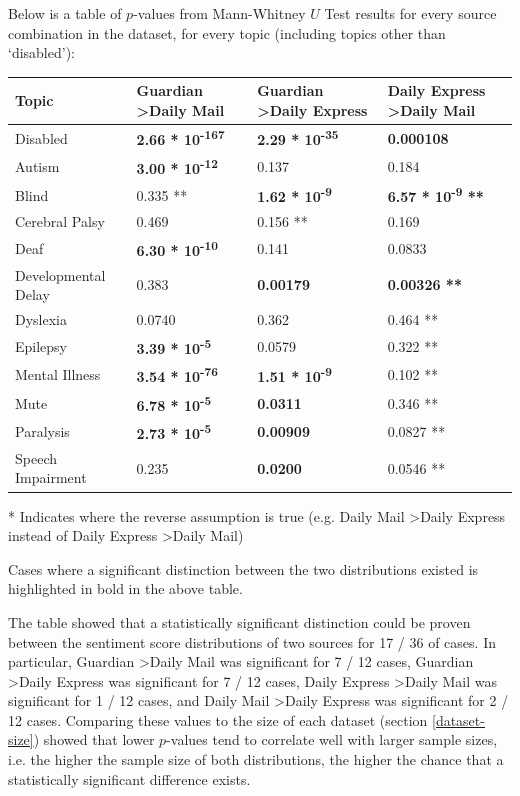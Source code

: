 \documentclass{report}
\begin{document}
Below is a table of $p$-values from Mann-Whitney $U$ Test results for every source combination in the dataset, for every topic (including topics other than `disabled'):

\noindent
\begin{tabu} to \textwidth { | X[c] | X[c] | X[c] | X[c] | }
	\hline
	Topic & Guardian \textgreater\space Daily Mail & Guardian \textgreater\space Daily Express & Daily Express \textgreater\space Daily Mail  \\
		\hline
	Disabled & \textbf{2.66 * 10\textsuperscript{-167}} & \textbf{2.29 * 10\textsuperscript{-35}} & \textbf{0.000108}  \\
	\hline
	Autism & \textbf{3.00 * 10\textsuperscript{-12}} & 0.137 & 0.184  \\
	\hline
	Blind & 0.335 ** & \textbf{1.62 * 10\textsuperscript{-9}} & \textbf{6.57 * 10\textsuperscript{-9} **} \\
	\hline
	Cerebral Palsy & 0.469 & 0.156 ** & 0.169  \\
	\hline
	Deaf & \textbf{6.30 * 10\textsuperscript{-10}} & 0.141 & 0.0833  \\
	\hline
	Developmental Delay & 0.383 & \textbf{0.00179} & \textbf{0.00326 **}  \\
	\hline
	Dyslexia & 0.0740 & 0.362 & 0.464 **  \\
	\hline
	Epilepsy & \textbf{3.39 * 10\textsuperscript{-5}} & 0.0579 & 0.322 **  \\
	\hline
	Mental Illness & \textbf{3.54 * 10\textsuperscript{-76}} & \textbf{1.51 * 10\textsuperscript{-9}} & 0.102 **  \\
	\hline
	Mute & \textbf{6.78 * 10\textsuperscript{-5}} & \textbf{0.0311} & 0.346 ** \\
	\hline
	Paralysis & \textbf{2.73 * 10\textsuperscript{-5}} & \textbf{0.00909} & 0.0827 **  \\
	\hline
	Speech Impairment & 0.235 & \textbf{0.0200} & 0.0546 **  \\
	\hline
\end{tabu}
\noindent ** Indicates where the reverse assumption is true (e.g. Daily Mail \textgreater\space Daily Express instead of Daily Express \textgreater\space Daily Mail)

Cases where a significant distinction between the two distributions existed is highlighted in bold in the above table.

The table showed that a statistically significant distinction could be proven between the sentiment score distributions of two sources for 17 / 36 of cases.
In particular, Guardian \textgreater\space Daily Mail was significant for 7 / 12 cases, Guardian \textgreater\space Daily Express was significant for 7 / 12 cases, Daily Express \textgreater\space Daily Mail was significant for 1 / 12 cases, and Daily Mail \textgreater\space Daily Express was significant for 2 / 12 cases.
Comparing these values to the size of each dataset (section \ref{dataset-size}) showed that lower $p$-values tend to correlate well with larger sample sizes, i.e. the higher the sample size of both distributions, the higher the chance that a statistically significant difference exists.
\end{document}
